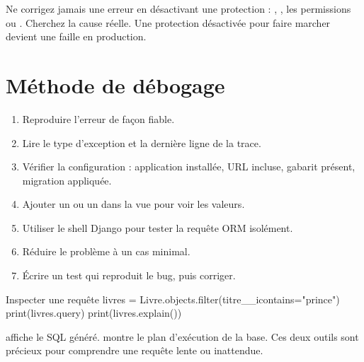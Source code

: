 \begin{piege}
Ne corrigez jamais une erreur en désactivant une protection : ,
, les permissions ou . Cherchez la cause réelle.
Une protection désactivée pour \og faire marcher \fg{} devient une faille en
production.
\end{piege}

\section{Méthode de débogage}

\begin{enumerate}
  \item Reproduire l'erreur de façon fiable.
  \item Lire le type d'exception et la dernière ligne de la trace.
  \item Vérifier la configuration : application installée, URL incluse, gabarit
        présent, migration appliquée.
  \item Ajouter un  ou un  dans la vue pour voir
        les valeurs.
  \item Utiliser le shell Django pour tester la requête ORM isolément.
  \item Réduire le problème à un cas minimal.
  \item Écrire un test qui reproduit le bug, puis corriger.
\end{enumerate}

\begin{codebox}[python]{Inspecter une requête}
livres = Livre.objects.filter(titre__icontains="prince")
print(livres.query)
print(livres.explain())
\end{codebox}

\begin{note}
 affiche le SQL généré.  montre le plan
d'exécution de la base. Ces deux outils sont précieux pour comprendre une requête
lente ou inattendue.
\end{note}
